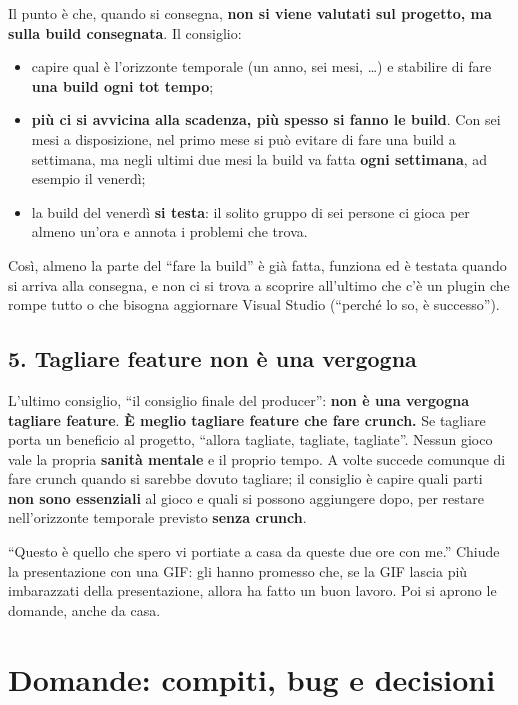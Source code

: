 Il punto è che, quando si consegna, \textbf{non si viene valutati sul progetto,
ma sulla build consegnata}. Il consiglio:
\begin{itemize}
  \item capire qual è l'orizzonte temporale (un anno, sei mesi, \dots) e
        stabilire di fare \textbf{una build ogni tot tempo};
  \item \textbf{più ci si avvicina alla scadenza, più spesso si fanno le
        build}. Con sei mesi a disposizione, nel primo mese si può evitare di
        fare una build a settimana, ma negli ultimi due mesi la build va fatta
        \textbf{ogni settimana}, ad esempio il venerdì;
  \item la build del venerdì \textbf{si testa}: il solito gruppo di sei persone
        ci gioca per almeno un'ora e annota i problemi che trova.
\end{itemize}
Così, almeno la parte del ``fare la build'' è già fatta, funziona ed è testata
quando si arriva alla consegna, e non ci si trova a scoprire all'ultimo che c'è
un plugin che rompe tutto o che bisogna aggiornare Visual Studio (``perché lo so,
è successo'').

\subsection{5. Tagliare feature non è una vergogna}

L'ultimo consiglio, ``il consiglio finale del producer'': \textbf{non è una
vergogna tagliare feature}. \textbf{È meglio tagliare feature che fare crunch.}
Se tagliare porta un beneficio al progetto, ``allora tagliate, tagliate,
tagliate''. Nessun gioco vale la propria \textbf{sanità mentale} e il proprio
tempo. A volte succede comunque di fare crunch quando si sarebbe dovuto tagliare;
il consiglio è capire quali parti \textbf{non sono essenziali} al gioco e quali
si possono aggiungere dopo, per restare nell'orizzonte temporale previsto
\textbf{senza crunch}.

``Questo è quello che spero vi portiate a casa da queste due ore con me.''
Chiude la presentazione con una GIF: gli hanno promesso che, se la GIF lascia più
imbarazzati della presentazione, allora ha fatto un buon lavoro. Poi si aprono
le domande, anche da casa.

\section{Domande: compiti, bug e decisioni}
\label{sec:z4-qa-marcello}

